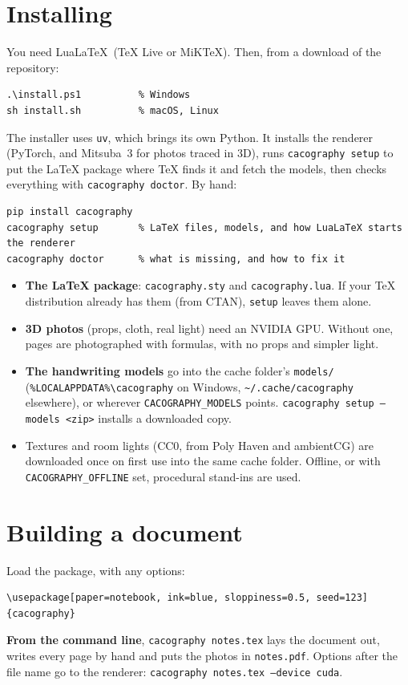 \documentclass[11pt]{article}
\begin{document}
\section{Installing}
You need Lua\LaTeX\ (TeX Live or MiKTeX). Then, from a download of the repository:
\begin{lstlisting}
.\install.ps1          % Windows
sh install.sh          % macOS, Linux
\end{lstlisting}
The installer uses \texttt{uv}, which brings its own Python. It installs the renderer
(PyTorch, and Mitsuba~3 for photos traced in 3D), runs \texttt{cacography setup} to put the
LaTeX package where TeX finds it and fetch the models, then checks everything with
\texttt{cacography doctor}. By hand:
\begin{lstlisting}
pip install cacography
cacography setup       % LaTeX files, models, and how LuaLaTeX starts the renderer
cacography doctor      % what is missing, and how to fix it
\end{lstlisting}
\begin{itemize}
\item \textbf{The LaTeX package}: \texttt{cacography.sty} and \texttt{cacography.lua}. If
  your TeX distribution already has them (from CTAN), \texttt{setup} leaves them alone.
\item \textbf{3D photos} (props, cloth, real light) need an NVIDIA GPU. Without one, pages
  are photographed with formulas, with no props and simpler light.
\item \textbf{The handwriting models} go into the cache folder's \texttt{models/}
  (\texttt{\%LOCALAPPDATA\%\textbackslash cacography} on Windows,
  \texttt{\textasciitilde/.cache/cacography} elsewhere), or wherever \texttt{CACOGRAPHY\_MODELS}
  points. \texttt{cacography setup --models <zip>} installs a downloaded copy.
\item Textures and room lights (CC0, from Poly Haven and ambientCG) are downloaded once on
  first use into the same cache folder. Offline, or with \texttt{CACOGRAPHY\_OFFLINE} set,
  procedural stand-ins are used.
\end{itemize}

\section{Building a document}
Load the package, with any options:
\begin{lstlisting}
\usepackage[paper=notebook, ink=blue, sloppiness=0.5, seed=123]{cacography}
\end{lstlisting}
\textbf{From the command line}, \texttt{cacography notes.tex} lays the document out, writes
every page by hand and puts the photos in \texttt{notes.pdf}. Options after the file name go
to the renderer: \texttt{cacography notes.tex --device cuda}.
\end{document}

